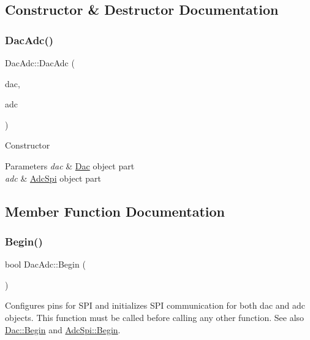 \subsection{Constructor \& Destructor Documentation}
\mbox{\label{classDacAdc_afb5c669fd66e4ff549506a58af0916e1}} 
\subsubsection{\texorpdfstring{Dac\+Adc()}{DacAdc()}}
{\footnotesize\ttfamily Dac\+Adc\+::\+Dac\+Adc (\begin{DoxyParamCaption}\item[{\mbox{\hyperlink{classDac}{Dac}} \&}]{dac,  }\item[{\mbox{\hyperlink{classAdcSpi}{Adc\+Spi}} \&}]{adc }\end{DoxyParamCaption})}

Constructor 
\begin{DoxyParams}{Parameters}
{\em dac} & \mbox{\hyperlink{classDac}{Dac}} object part \\
\hline
{\em adc} & \mbox{\hyperlink{classAdcSpi}{Adc\+Spi}} object part \\
\hline
\end{DoxyParams}


\subsection{Member Function Documentation}
\mbox{\label{classDacAdc_adc136f0dd9872a8f10b908891a4f604b}} 
\subsubsection{\texorpdfstring{Begin()}{Begin()}}
{\footnotesize\ttfamily bool Dac\+Adc\+::\+Begin (\begin{DoxyParamCaption}\item[{void}]{ }\end{DoxyParamCaption})}

Configures pins for S\+PI and initializes S\+PI communication for both dac and adc objects. This function must be called before calling any other function. See also \mbox{\hyperlink{classDac_ad88e0048e59c0633b72769ddb8337e49}{Dac\+::\+Begin}} and \mbox{\hyperlink{classAdcSpi_aa8f8f27578dd85cfcdbc9439bbce66cb}{Adc\+Spi\+::\+Begin}}. \mbox{\label{classDacAdc_a9a6705b1fa5ecc977ef08a9189d3bf87}} 
